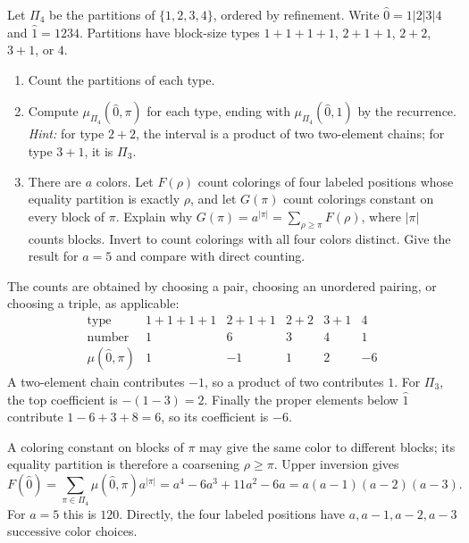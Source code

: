 \studentbreak
{}
Let $\Pi_4$ be the partitions of $\{1,2,3,4\}$, ordered by refinement.
Write $\hat0=1|2|3|4$ and $\hat1=1234$.
Partitions have block-size types $1+1+1+1$, $2+1+1$, $2+2$, $3+1$, or $4$.
\begin{enumerate}
 \item Count the partitions of each type. 
 \item Compute $\mu_{\Pi_4}(\hat0,\pi)$ for each type, ending with
 $\mu_{\Pi_4}(\hat0,\hat1)$ by the recurrence.
 \emph{Hint:} for type $2+2$, the interval is a product of two
 two-element chains; for type $3+1$, it is $\Pi_3$. 
 \item There are $a$ colors. Let $F(\rho)$ count colorings of four labeled
 positions whose equality partition is exactly $\rho$, and let $G(\pi)$
 count colorings constant on every block of $\pi$. Explain why
 $G(\pi)=a^{|\pi|}=\sum_{\rho\ge\pi}F(\rho)$, where $|\pi|$ counts blocks.
 Invert to count colorings with all four colors distinct. Give the result
 for $a=5$ and compare with direct counting. 
\end{enumerate}
\begin{solution}
The counts are obtained by choosing a pair, choosing an unordered pairing,
or choosing a triple, as applicable:
\[
\begin{array}{c|rrrrr}
 \text{type}&1+1+1+1&2+1+1&2+2&3+1&4\\\hline
 \text{number}&1&6&3&4&1\\
 \mu(\hat0,\pi)&1&-1&1&2&-6
\end{array}
\]
A two-element chain contributes $-1$, so a product of two contributes $1$.
For $\Pi_3$, the top coefficient is $-(1-3)=2$. Finally the proper elements
below $\hat1$ contribute $1-6+3+8=6$, so its coefficient is $-6$.

A coloring constant on blocks of $\pi$ may give the same color to different
blocks; its equality partition is therefore a coarsening $\rho\ge\pi$.
Upper inversion gives
\[
 F(\hat0)=\sum_{\pi\in\Pi_4}\mu(\hat0,\pi)a^{|\pi|}
 =a^4-6a^3+11a^2-6a=a(a-1)(a-2)(a-3).
\]
For $a=5$ this is $120$. Directly, the four labeled positions have
$a,a-1,a-2,a-3$ successive color choices.
\end{solution}


